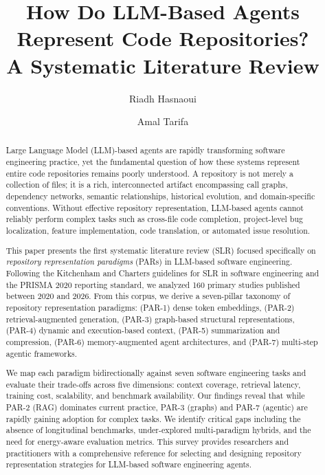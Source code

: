 \documentclass[acmsmall,review]{acmart}
\newcommand{\parcmd}[1]{\textsc{PAR-#1}\xspace}
\begin{document}
\title{How Do LLM-Based Agents Represent Code Repositories?\\
       A Systematic Literature Review}

\author{Riadh Hasnaoui}

\author{Amal Tarifa}

\begin{abstract}
Large Language Model (LLM)-based agents are rapidly transforming software engineering practice,
yet the fundamental question of how these systems represent entire code repositories remains
poorly understood. A repository is not merely a collection of files; it is a rich, interconnected
artifact encompassing call graphs, dependency networks, semantic relationships, historical
evolution, and domain-specific conventions. Without effective repository representation,
LLM-based agents cannot reliably perform complex tasks such as cross-file code completion,
project-level bug localization, feature implementation, code translation, or automated issue
resolution.

This paper presents the first systematic literature review (SLR) focused specifically on
\emph{repository representation paradigms} (PARs) in LLM-based software engineering.
Following the Kitchenham and Charters guidelines for SLR in software engineering and the
PRISMA 2020 reporting standard, we analyzed 160 primary studies published between 2020 and
2026. From this corpus, we derive a seven-pillar taxonomy of repository representation
paradigms: (\parcmd{1}) dense token embeddings, (\parcmd{2}) retrieval-augmented generation,
(\parcmd{3}) graph-based structural representations, (\parcmd{4}) dynamic and execution-based
context, (\parcmd{5}) summarization and compression, (\parcmd{6}) memory-augmented agent
architectures, and (\parcmd{7}) multi-step agentic frameworks.

We map each paradigm bidirectionally against seven software engineering tasks and evaluate
their trade-offs across five dimensions: context coverage, retrieval latency, training cost,
scalability, and benchmark availability. Our findings reveal that while \parcmd{2} (RAG)
dominates current practice, \parcmd{3} (graphs) and \parcmd{7} (agentic) are rapidly gaining
adoption for complex tasks. We identify critical gaps including the absence of longitudinal
benchmarks, under-explored multi-paradigm hybrids, and the need for energy-aware evaluation
metrics. This survey provides researchers and practitioners with a comprehensive reference for
selecting and designing repository representation strategies for LLM-based software engineering
agents.
\end{abstract}
\end{document}
